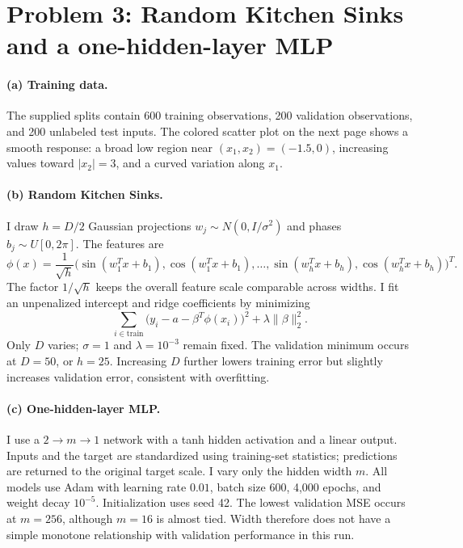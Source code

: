 \section*{Problem 3: Random Kitchen Sinks and a one-hidden-layer MLP}

\paragraph{(a) Training data.} The supplied splits contain 600 training observations, 200 validation observations, and 200 unlabeled test inputs. The colored scatter plot on the next page shows a smooth response: a broad low region near $(x_1,x_2)=(-1.5,0)$, increasing values toward $|x_2|=3$, and a curved variation along $x_1$.

\paragraph{(b) Random Kitchen Sinks.} I draw $h=D/2$ Gaussian projections $w_j\sim N(0,I/\sigma^2)$ and phases $b_j\sim U[0,2\pi]$. The features are
\[
\phi(x)=\frac{1}{\sqrt h}\big(\sin(w_1^Tx+b_1),\cos(w_1^Tx+b_1),\ldots,
\sin(w_h^Tx+b_h),\cos(w_h^Tx+b_h)\big)^T.
\]
The factor $1/\sqrt h$ keeps the overall feature scale comparable across widths. I fit an unpenalized intercept and ridge coefficients by minimizing
\[
\sum_{i\in\mathrm{train}}\big(y_i-a-\beta^T\phi(x_i)\big)^2+\lambda\|\beta\|_2^2.
\]
Only $D$ varies; $\sigma=1$ and $\lambda=10^{-3}$ remain fixed. The validation minimum occurs at $D=50$, or $h=25$. Increasing $D$ further lowers training error but slightly increases validation error, consistent with overfitting.

\paragraph{(c) One-hidden-layer MLP.} I use a $2\to m\to1$ network with a tanh hidden activation and a linear output. Inputs and the target are standardized using training-set statistics; predictions are returned to the original target scale. I vary only the hidden width $m$. All models use Adam with learning rate $0.01$, batch size 600, 4,000 epochs, and weight decay $10^{-5}$. Initialization uses seed 42. The lowest validation MSE occurs at $m=256$, although $m=16$ is almost tied. Width therefore does not have a simple monotone relationship with validation performance in this run.

